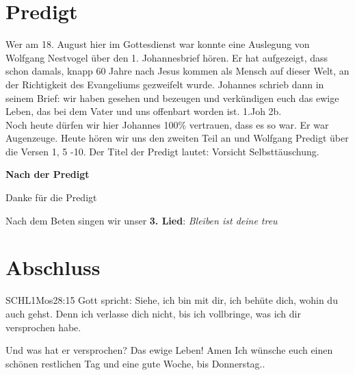 \section{Predigt}
Wer am 18. August hier im Gottesdienst war konnte eine Auslegung von Wolfgang Nestvogel über den 1. Johannesbrief hören. Er hat aufgezeigt, dass schon damals, knapp 60 Jahre nach Jesus kommen als Mensch auf dieser Welt, an der Richtigkeit des Evangeliums gezweifelt wurde. Johannes schrieb dann in seinem Brief: wir haben gesehen und bezeugen und verkündigen euch das ewige Leben, das bei dem Vater und uns offenbart worden ist. 1.Joh 2b.\\
Noch heute dürfen wir hier Johannes 100\% vertrauen, dass es so war. Er war Augenzeuge. Heute hören wir uns den zweiten Teil an und Wolfgang Predigt über die Versen 1, 5 -10. Der Titel der Predigt lautet: Vorsicht Selbsttäuschung.

\textbf{Nach der Predigt}

Danke für die Predigt

Nach dem Beten singen wir unser \textbf{3. Lied}: \textit{Bleiben ist deine treu}\\

\section{Abschluss}

\begin{bibelbox}{SCHL}{1Mos}{28:15}
Gott spricht: Siehe, ich bin mit dir,
ich behüte dich, wohin du auch gehst.
Denn ich verlasse dich nicht,
bis ich vollbringe, was ich dir versprochen habe.
\end{bibelbox}
Und was hat er versprochen? Das ewige Leben!
Amen
Ich wünsche euch einen schönen restlichen Tag und eine gute Woche, bis Donnerstag..
